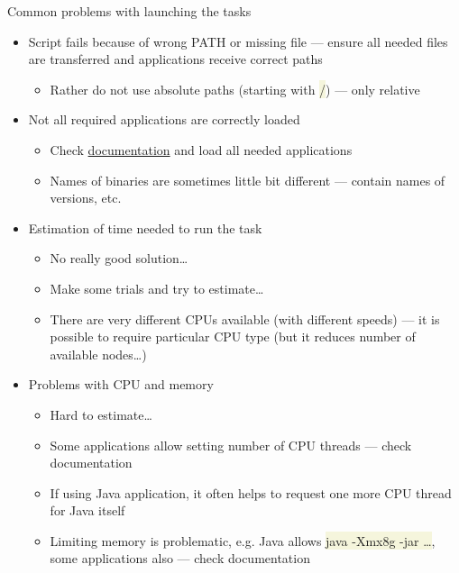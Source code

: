 \documentclass[compress, xelatex, 11pt, xcolor=svgnames, aspectratio=169,
	hyperref={
		bookmarks=true,
		unicode=true,
		colorlinks=true,
		pdftitle={Linux, command line and MetaCentrum},
		plainpages=false,
		pdfauthor={Vojtech Zeisek},
		pdfsubject={Course about use of Linux command line, writing shell scripts and using MetaCentrum of CESNET},
		pdfcreator={XeLaTeX},
		pdfkeywords={Linux, GNU, BASH, shell, command line, MetaCentrum},
		linkcolor=DarkRed, %
		anchorcolor=DarkBlue, %
		citecolor=Indigo, %
		filecolor=NavyBlue, %
		menucolor=DarkMagenta, %
		urlcolor=DarkBlue, %
		},
	url={hyphens, lowtilde} %
	]{beamer}
\renewcommand{\texttt}[1]{\colorbox{Beige}{{\ttfamily #1}}}
\begin{document}
\begin{frame}{Common problems with launching the tasks}
	\begin{itemize}
		\item Script fails because of wrong PATH or missing file --- ensure all needed files are transferred and applications receive correct paths
		\begin{itemize}
			\item Rather do not use absolute paths (starting with \texttt{/}) --- only relative
		\end{itemize}
		\item Not all required applications are correctly loaded
		\begin{itemize}
			\item Check \href{https://docs.metacentrum.cz/}{documentation} and load all needed applications
			\item Names of binaries are sometimes little bit different --- contain names of versions, etc.
		\end{itemize}
		\item Estimation of time needed to run the task
		\begin{itemize}
			\item No really good solution\ldots
			\item Make some trials and try to estimate\ldots
			\item There are very different CPUs available (with different speeds) --- it is possible to require particular CPU type (but it reduces number of available nodes\ldots)
		\end{itemize}
		\item Problems with CPU and memory
		\begin{itemize}
			\item Hard to estimate\ldots
			\item Some applications allow setting number of CPU threads --- check documentation
			\item If using Java application, it often helps to request one more CPU thread for Java itself
			\item Limiting memory is problematic, e.g. Java allows \texttt{java -Xmx8g -jar \ldots}, some applications also --- check documentation
		\end{itemize}
	\end{itemize}
\end{frame}
\end{document}
